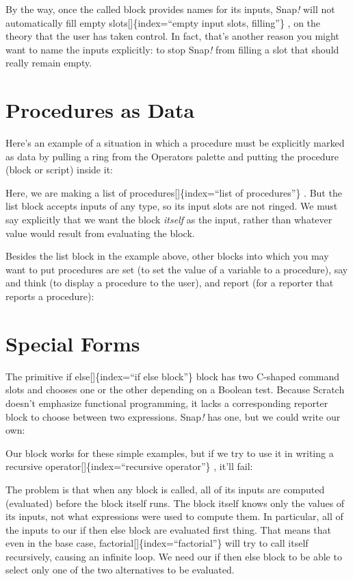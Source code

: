 \documentclass[
  letterpaper,
]{book}
\begin{document}
By the way, once the called block provides names for its inputs,
Snap\emph{!} will not automatically fill empty
slots{[}{]}\{index=``empty input slots, filling''\} , on the theory that
the user has taken control. In fact, that's another reason you might
want to name the inputs explicitly: to stop Snap\emph{!} from filling a
slot that should really remain empty.

\section{Procedures as Data}\label{procedures-as-data-1}

Here's an example of a situation in which a procedure must be explicitly
marked as data by pulling a ring from the Operators palette and putting
the procedure (block or script) inside it:

Here, we are making a list of procedures{[}{]}\{index=``list of
procedures''\} . But the list block accepts inputs of any type, so its
input slots are not ringed. We must say explicitly that we want the
block \emph{itself} as the input, rather than whatever value would
result from evaluating the block.

Besides the list block in the example above, other blocks into which you
may want to put procedures are set (to set the value of a variable to a
procedure), say and think (to display a procedure to the user), and
report (for a reporter that reports a procedure):

\section{Special Forms}\label{special-forms}

The primitive if else{[}{]}\{index=``if else block''\} block has two
C-shaped command slots and chooses one or the other depending on a
Boolean test. Because Scratch doesn't emphasize functional programming,
it lacks a corresponding reporter block to choose between two
expressions. Snap\emph{!} has one, but we could write our own:

Our block works for these simple examples, but if we try to use it in
writing a recursive operator{[}{]}\{index=``recursive operator''\} ,
it'll fail:

The problem is that when any block is called, all of its inputs are
computed (evaluated) before the block itself runs. The block itself
knows only the values of its inputs, not what expressions were used to
compute them. In particular, all of the inputs to our if then else block
are evaluated ﬁrst thing. That means that even in the base case,
factorial{[}{]}\{index=``factorial''\} will try to call itself
recursively, causing an infinite loop. We need our if then else block to
be able to select only one of the two alternatives to be evaluated.
\end{document}
